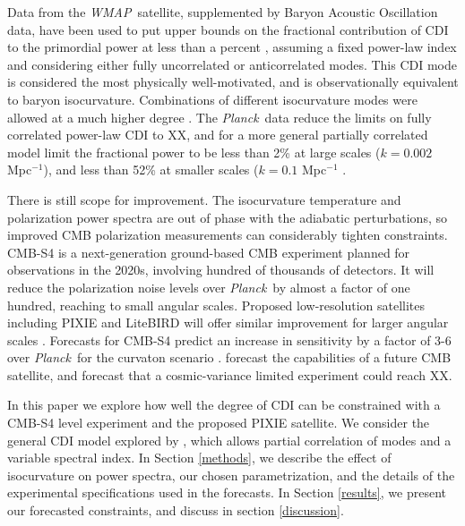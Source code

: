 \documentclass{emulateapj}
\newcommand{\planck}{{\it Planck}}
\newcommand{\wmap}{{\it WMAP}}
\begin{document}
Data from the \wmap\ satellite, supplemented by Baryon Acoustic Oscillation data, have been used to put upper bounds on the fractional contribution of CDI to the primordial power at less than a percent \citep{hinshaw/etal:2013}, assuming a fixed power-law index and considering either fully uncorrelated or anticorrelated modes. This CDI mode is considered the most physically well-motivated, and is observationally equivalent to baryon isocurvature. Combinations of different isocurvature modes were allowed at a much higher degree \cite{bean}. The \planck\ data reduce the limits on fully correlated power-law CDI to XX, and for a more general partially correlated model limit the fractional power  to be less than 2\% at large scales ($k=0.002$ Mpc$^{-1}$), and less than 52\% at smaller scales ($k=0.1$ Mpc$^{-1}$ \citep{planckXX:2015}.

There is still scope for improvement. The isocurvature temperature and polarization power spectra are out of phase with the adiabatic perturbations, so improved CMB polarization measurements can considerably tighten constraints. CMB-S4 is a next-generation ground-based CMB experiment planned for observations in the 2020s, involving hundred of thousands of detectors. It will reduce the polarization noise levels over \planck\ by almost a factor of one hundred, reaching to small angular scales. Proposed low-resolution satellites including PIXIE and LiteBIRD will offer similar improvement for larger angular scales \citep{pixie,litebird}. Forecasts for CMB-S4  predict an increase in sensitivity by a factor of 3-6 over \planck\ for the curvaton scenario \citep{CMB-S4:2016}. \cite{kasanda/moodley:2014} forecast the capabilities of a future CMB satellite, and \cite{smith/grin:2016} forecast that a cosmic-variance limited experiment could reach XX. 

In this paper we explore how well the degree of CDI can be constrained with a CMB-S4 level experiment and the proposed PIXIE satellite.  We consider the general CDI model explored by \citet{planck_inflation}, which allows partial correlation of modes and a variable spectral index. 
In Section \ref{methods}, we describe the effect of isocurvature on power spectra, our chosen parametrization, and the details of the experimental specifications used in the forecasts. In Section \ref{results}, we present our forecasted constraints, and discuss in section \ref{discussion}.
\end{document}
